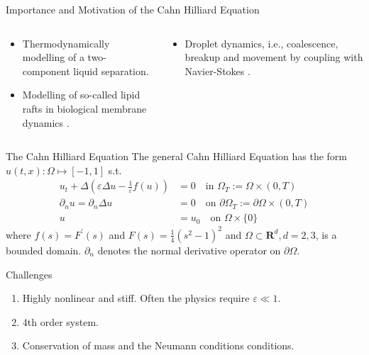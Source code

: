 \begin{frame}{Importance and Motivation of the Cahn Hilliard Equation}
    \begin{columns}
        \begin{column}{0.5\textwidth}
            \begin{itemize}
            \item Thermodynamically modelling of a two-component liquid separation\footnotemark.
                \item Modelling of so-called lipid rafts in biological membrane dynamics \footnotemark.
            \end{itemize}
        \end{column}
        \begin{column}{0.5\textwidth}
            \begin{itemize}
                \item Droplet dynamics, i.e., coalescence, breakup and movement by coupling with Navier-Stokes \footnotemark.
            \end{itemize}
        \end{column}
    \end{columns}
\end{frame}

\begin{frame}
    \begin{block}{The Cahn Hilliard Equation}
        The general Cahn Hilliard Equation  has the form $u( t,x): \Omega \mapsto [-1,1]   $ s.t.
            \[
            \begin{split}
                 u_t+\Delta\left(\varepsilon \Delta u-\frac{1}{\varepsilon} f(u)\right)&=0 \quad \text{in } \Omega_T:=\Omega \times(0, T) \\
\partial_n u=\partial_n \Delta u& =0 \quad \text{on } \partial \Omega_T:=\partial \Omega \times(0, T) \\
 u & =u_0 \quad \text{on } \Omega \times\{0\}
            \end{split}
            \]
where $f(s)=F^{\prime}(s)$ and $F(s)=\frac{1}{4}\left(s^2-1\right)^2$ and $\Omega \subset \mathbf{R}^d, d=2,3$, is a bounded domain. $\partial_n$ denotes the normal derivative operator on $\partial \Omega$.
\end{block}

\begin{block}{Challenges}
    \begin{enumerate}
        \item Highly nonlinear and stiff. Often the physics require $\varepsilon \ll 1$.
        \item 4th order system.
        \item Conservation of mass and the Neumann conditions conditions.
    \end{enumerate}
\end{block}

\end{frame}



